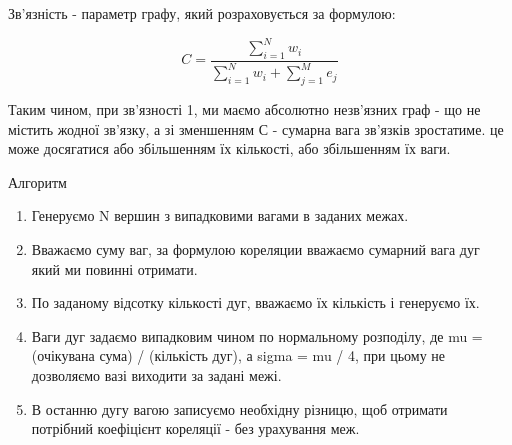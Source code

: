     Зв'язність - параметр графу, який розраховується за формулою:
    
    \[ C = \frac{\sum_{i=1}^N{w_i}}{\sum_{i=1}^N{w_i} + \sum_{j=1}^M{e_j}}\]

    Таким чином, при зв'язності 1, ми маємо абсолютно незв'язних граф - що не містить
    жодної зв'язку, а зі зменшенням С - сумарна вага зв'язків зростатиме. це
    може досягатися або збільшенням їх кількості, або збільшенням їх ваги.

Алгоритм

\begin{enumerate}
    \item Генеруємо N вершин з випадковими вагами в заданих межах.
    \item Вважаємо суму ваг, за формулою кореляции вважаємо сумарний вага дуг який ми повинні отримати.
    \item По заданому відсотку кількості дуг, вважаємо їх кількість і генеруємо їх.
    \item Ваги дуг задаємо випадковим чином по нормальному розподілу, де mu = (очікувана сума) / (кількість дуг), а sigma = mu / 4, при цьому не дозволяємо вазі виходити за задані межі.
    \item В останню дугу вагою записуємо необхідну різницю, щоб отримати потрібний коефіцієнт кореляції - без урахування меж.
\end{enumerate}